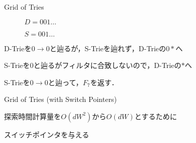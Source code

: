 \documentclass[12pt,dvipdfmx,mathserif,uplatex,aspectratio=32]{beamer}
\begin{document}
\begin{frame}{Grid of Tries}

\begin{figure}[h]
 \def\@captype{table}
 \begin{minipage}[c]{.55\textwidth}
   \scalebox{0.55}{}
  \end{minipage}
  \hfill
  \begin{minipage}[c]{.2\textwidth}
  $D = 001 \dots$
  \par
  $S = 001 \dots$
  \end{minipage}
\end{figure}

\vspace{3mm}
D-Trieを$0 \to 0$と辿るが，S-Trieを辿れず，D-Trieの$0*$へ
\par
\vspace{2mm}
S-Trieを$0$と辿るがフィルタに合致しないので，D-Trieの$*$へ
\par
\vspace{2mm}
S-Trieを$0 \to 0$と辿って，$F_{7}$を返す．
\end{frame}

\begin{frame}{Grid of Tries (with Switch Pointers)}

 \begin{figure}
  {\centering
  \scalebox{0.6}{}

  }
 \end{figure}

\vspace{5mm}

探索時間計算量を$O(dW^{2})$から$O(dW)$とするために
\par
\vspace{3mm}
スイッチポインタを与える

\end{frame}
\end{document}
